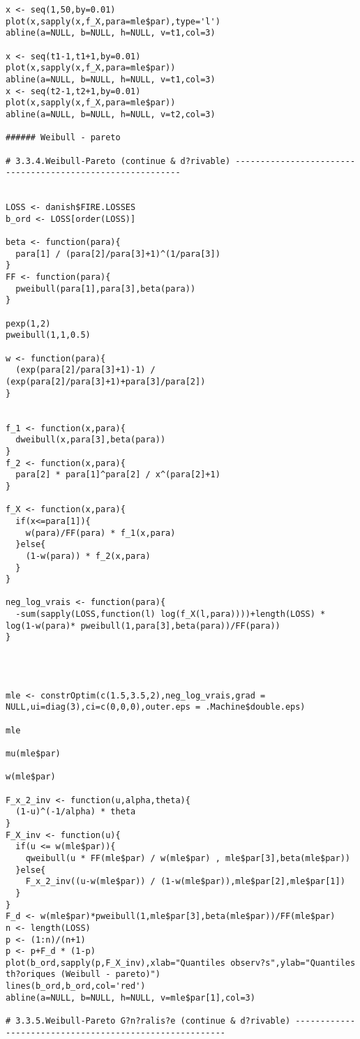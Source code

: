 \begin{verbatim}
x <- seq(1,50,by=0.01)
plot(x,sapply(x,f_X,para=mle$par),type='l')
abline(a=NULL, b=NULL, h=NULL, v=t1,col=3)

x <- seq(t1-1,t1+1,by=0.01)
plot(x,sapply(x,f_X,para=mle$par))
abline(a=NULL, b=NULL, h=NULL, v=t1,col=3)
x <- seq(t2-1,t2+1,by=0.01)
plot(x,sapply(x,f_X,para=mle$par))
abline(a=NULL, b=NULL, h=NULL, v=t2,col=3)

###### Weibull - pareto

# 3.3.4.Weibull-Pareto (continue & d?rivable) -----------------------------------------------------------


LOSS <- danish$FIRE.LOSSES
b_ord <- LOSS[order(LOSS)]

beta <- function(para){
  para[1] / (para[2]/para[3]+1)^(1/para[3])
}
FF <- function(para){
  pweibull(para[1],para[3],beta(para))
}

pexp(1,2)
pweibull(1,1,0.5)

w <- function(para){
  (exp(para[2]/para[3]+1)-1) / (exp(para[2]/para[3]+1)+para[3]/para[2])
}


f_1 <- function(x,para){
  dweibull(x,para[3],beta(para))
}
f_2 <- function(x,para){
  para[2] * para[1]^para[2] / x^(para[2]+1)
}

f_X <- function(x,para){
  if(x<=para[1]){
    w(para)/FF(para) * f_1(x,para)
  }else{
    (1-w(para)) * f_2(x,para)
  } 
}

neg_log_vrais <- function(para){
  -sum(sapply(LOSS,function(l) log(f_X(l,para))))+length(LOSS) * log(1-w(para)* pweibull(1,para[3],beta(para))/FF(para))
}




mle <- constrOptim(c(1.5,3.5,2),neg_log_vrais,grad = NULL,ui=diag(3),ci=c(0,0,0),outer.eps = .Machine$double.eps)

mle

mu(mle$par)

w(mle$par)

F_x_2_inv <- function(u,alpha,theta){
  (1-u)^(-1/alpha) * theta
}
F_X_inv <- function(u){
  if(u <= w(mle$par)){
    qweibull(u * FF(mle$par) / w(mle$par) , mle$par[3],beta(mle$par))
  }else{
    F_x_2_inv((u-w(mle$par)) / (1-w(mle$par)),mle$par[2],mle$par[1])
  }
}
F_d <- w(mle$par)*pweibull(1,mle$par[3],beta(mle$par))/FF(mle$par)
n <- length(LOSS)
p <- (1:n)/(n+1)
p <- p+F_d * (1-p)
plot(b_ord,sapply(p,F_X_inv),xlab="Quantiles observ?s",ylab="Quantiles th?oriques (Weibull - pareto)")
lines(b_ord,b_ord,col='red')
abline(a=NULL, b=NULL, h=NULL, v=mle$par[1],col=3)

# 3.3.5.Weibull-Pareto G?n?ralis?e (continue & d?rivable) --------------------------------------------------------


\end{verbatim}
